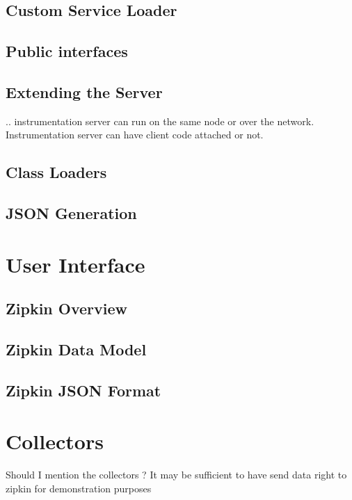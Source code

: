 \subsection{Custom Service Loader}
\subsection{Public interfaces}
\subsection{Extending the Server}
.. instrumentation server can run on the same node or over the network. Instrumentation server can have client code attached or not.
\subsection{Class Loaders}
\subsection{JSON Generation}
\section{User Interface}
\subsection{Zipkin Overview}
\subsection{Zipkin Data Model}
\subsection{Zipkin JSON Format}
\section{Collectors}
Should I mention the collectors ? It may be sufficient to have send data right to zipkin for demonstration purposes
